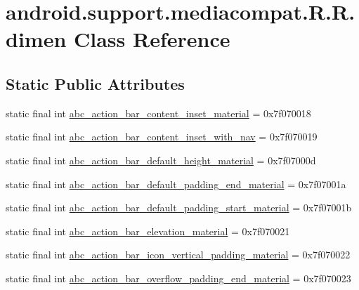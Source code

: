 \hypertarget{classandroid_1_1support_1_1mediacompat_1_1_r_1_1dimen}{
\section{android.support.mediacompat.R.R.dimen Class Reference}
\label{classandroid_1_1support_1_1mediacompat_1_1_r_1_1dimen}
}
\subsection*{Static Public Attributes}
\begin{CompactItemize}
\item 
static final int \hyperlink{classandroid_1_1support_1_1mediacompat_1_1_r_1_1dimen_fda4c6c14dee07faf88843cedeb95a0c}{abc\_\-action\_\-bar\_\-content\_\-inset\_\-material} = 0x7f070018
\item 
static final int \hyperlink{classandroid_1_1support_1_1mediacompat_1_1_r_1_1dimen_3c91dc7b1ca22eda11984a0bd9a081f4}{abc\_\-action\_\-bar\_\-content\_\-inset\_\-with\_\-nav} = 0x7f070019
\item 
static final int \hyperlink{classandroid_1_1support_1_1mediacompat_1_1_r_1_1dimen_08f21bf5d73f793d956b31f9398629d6}{abc\_\-action\_\-bar\_\-default\_\-height\_\-material} = 0x7f07000d
\item 
static final int \hyperlink{classandroid_1_1support_1_1mediacompat_1_1_r_1_1dimen_7c03eed68f8f1fe990661814d3317c6d}{abc\_\-action\_\-bar\_\-default\_\-padding\_\-end\_\-material} = 0x7f07001a
\item 
static final int \hyperlink{classandroid_1_1support_1_1mediacompat_1_1_r_1_1dimen_41e1523048f73e3aa4f885df16562034}{abc\_\-action\_\-bar\_\-default\_\-padding\_\-start\_\-material} = 0x7f07001b
\item 
static final int \hyperlink{classandroid_1_1support_1_1mediacompat_1_1_r_1_1dimen_2bb99d2cdd46bfb59ec7349d3b8e953a}{abc\_\-action\_\-bar\_\-elevation\_\-material} = 0x7f070021
\item 
static final int \hyperlink{classandroid_1_1support_1_1mediacompat_1_1_r_1_1dimen_3682fac1212fef3ed85f56189133579f}{abc\_\-action\_\-bar\_\-icon\_\-vertical\_\-padding\_\-material} = 0x7f070022
\item 
static final int \hyperlink{classandroid_1_1support_1_1mediacompat_1_1_r_1_1dimen_d2f687efad9431c1a8f68920342667aa}{abc\_\-action\_\-bar\_\-overflow\_\-padding\_\-end\_\-material} = 0x7f070023
\item 

\end{CompactItemize}
